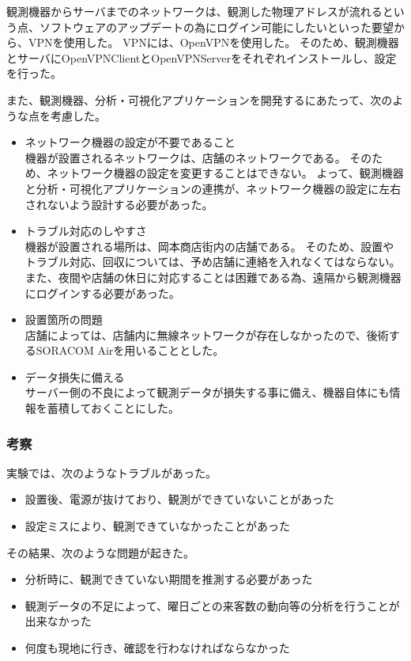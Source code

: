 観測機器からサーバまでのネットワークは、観測した物理アドレスが流れるという点、ソフトウェアのアップデートの為にログイン可能にしたいといった要望から、VPNを使用した。
VPNには、OpenVPNを使用した。
そのため、観測機器とサーバにOpenVPNClientとOpenVPNServerをそれぞれインストールし、設定を行った。

また、観測機器、分析・可視化アプリケーションを開発するにあたって、次のような点を考慮した。
\begin{itemize}
\item ネットワーク機器の設定が不要であること\\
	機器が設置されるネットワークは、店舗のネットワークである。
	そのため、ネットワーク機器の設定を変更することはできない。
	よって、観測機器と分析・可視化アプリケーションの連携が、ネットワーク機器の設定に左右されないよう設計する必要があった。
\item トラブル対応のしやすさ\\
	機器が設置される場所は、岡本商店街内の店舗である。
	そのため、設置やトラブル対応、回収については、予め店舗に連絡を入れなくてはならない。
	また、夜間や店舗の休日に対応することは困難である為、遠隔から観測機器にログインする必要があった。
\item 設置箇所の問題\\
	店舗によっては、店舗内に無線ネットワークが存在しなかったので、後術するSORACOM Airを用いることとした。
\item データ損失に備える\\
	サーバー側の不良によって観測データが損失する事に備え、機器自体にも情報を蓄積しておくことにした。
\end{itemize}

\subsubsection{考察}
実験では、次のようなトラブルがあった。
\begin{itemize}
\item 設置後、電源が抜けており、観測ができていないことがあった
\item 設定ミスにより、観測できていなかったことがあった
\end{itemize}

その結果、次のような問題が起きた。
\begin{itemize}
\item 分析時に、観測できていない期間を推測する必要があった
\item 観測データの不足によって、曜日ごとの来客数の動向等の分析を行うことが出来なかった
\item 何度も現地に行き、確認を行わなければならなかった
\end{itemize}

